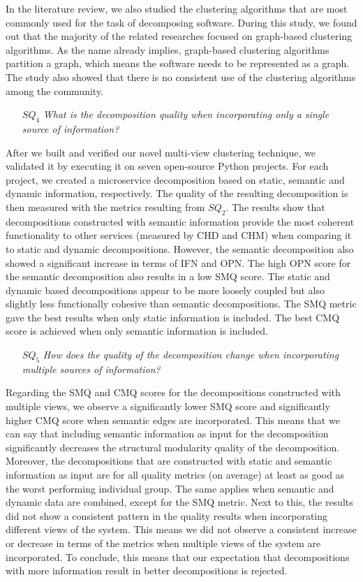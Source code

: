 In the literature review, we also studied the clustering algorithms that are most commonly used for the task of decomposing software. During this study, we found out that the majority of the related researches focused on graph-based clustering algorithms. As the name already implies, graph-based clustering algorithms partition a graph, which means the software needs to be represented as a graph. The study also showed that there is no consistent use of the clustering algorithms among the community.

\begin{itemize}
    \item[$SQ_4$] \textit{What is the decomposition quality when incorporating only a single source of information?}
\end{itemize}

After we built and verified our novel multi-view clustering technique, we validated it by executing it on seven open-source Python projects. For each project, we created a microservice decomposition based on static, semantic and dynamic information, respectively. The quality of the resulting decomposition is then measured with the metrics resulting from $SQ_2$. The results show that decompositions constructed with semantic information provide the most coherent functionality to other services (measured by CHD and CHM) when comparing it to static and dynamic decompositions. However, the semantic decomposition also showed a significant increase in terms of IFN and OPN. The high OPN score for the semantic decomposition also results in a low SMQ score. The static and dynamic based decompositions appear to be more loosely coupled but also slightly less functionally cohesive than semantic decompositions. The SMQ metric gave the best results when only static information is included. The best CMQ score is achieved when only semantic information is included.

\begin{itemize}
    \item[$SQ_5$] \textit{How does the quality of the decomposition change when incorporating multiple sources of information?}
\end{itemize}

Regarding the SMQ and CMQ scores for the decompositions constructed with multiple views, we observe a significantly lower SMQ score and significantly higher CMQ score when semantic edges are incorporated. This means that we can
say that including semantic information as input for the decomposition significantly decreases the structural modularity quality of the decomposition. Moreover, the decompositions that are constructed with static and semantic information as input are for all quality metrics (on average) at least as good as the worst performing individual group. The same applies when semantic and dynamic data are combined, except for the SMQ metric. 
Next to this, the results did not show a consistent pattern in the quality results when incorporating different views of the system. This means we did not observe a consistent increase or decrease in terms of the metrics when multiple views of the system are incorporated. To conclude, this means that our expectation that decompositions with more information result in better decompositions is rejected.

